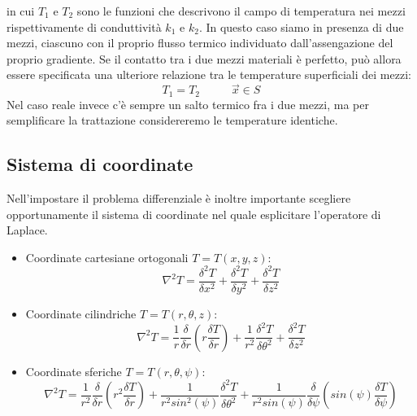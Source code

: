 \begin{itemize}
\[    \]
    in cui $T_1$ e $T_2$ sono le funzioni che descrivono il campo di temperatura nei mezzi rispettivamente di conduttività $k_1$ e $k_2$.\newline
    \newline
    In questo caso siamo in presenza di due mezzi, ciascuno con il proprio flusso termico individuato dall'assengazione del proprio gradiente.\newline
    \newline
    Se il contatto tra i due mezzi materiali è perfetto, può allora essere specificata una ulteriore relazione tra le temperature superficiali dei mezzi:
    \[
        T_1 = T_2 \;\;\;\;\;\;\;\;\;\; \vec{x} \in S
    \]
    Nel caso reale invece c'è sempre un salto termico fra i due mezzi, ma per semplificare la trattazione considereremo le temperature identiche.
\end{itemize}
\subsection{Sistema di coordinate}
Nell’impostare il problema differenziale è inoltre importante scegliere
opportunamente il sistema di coordinate nel quale esplicitare l’operatore di
Laplace.
\begin{itemize}
    \item Coordinate cartesiane ortogonali $T = T(x,y,z)$:
    \[
        \nabla^2T = \frac{\delta^2T}{\delta x^2} + \frac{\delta^2T}{\delta y^2} + \frac{\delta^2T}{\delta z^2}
    \]
    \item Coordinate cilindriche $T = T(r, \theta, z)$:
    \[
        \nabla ^2 T = \frac{1}{r} \frac{\delta }{\delta r} \left(r \frac{\delta T}{\delta r}\right) + \frac{1}{r^2}\frac{\delta^2 T}{\delta \theta^2} + \frac{\delta^2 T}{\delta z^2}
    \]
    \item Coordinate sferiche $T = T(r, \theta, \psi)$:
    \[
        \nabla^2 T = \frac{1}{r^2} \frac{\delta}{\delta r}\left(r^2 \frac{\delta T}{\delta r}\right) + \frac{1}{r^2 sin^2(\psi)}\frac{\delta^2 T}{\delta \theta^2} + \frac{1}{r^2 sin(\psi)}\frac{\delta}{\delta\psi}\left(sin(\psi)\frac{\delta T}{\delta \psi}\right)
    \]
\end{itemize}
